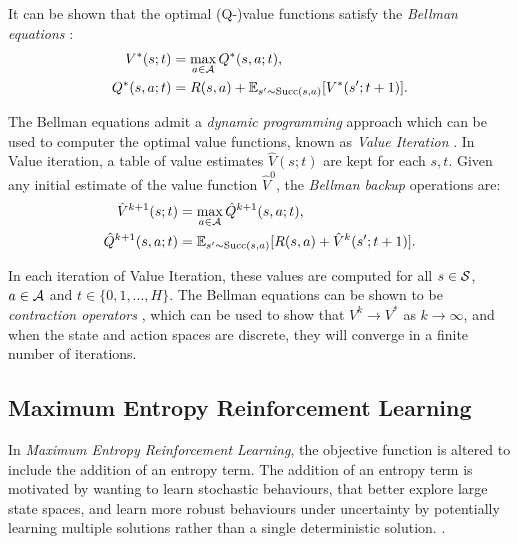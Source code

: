     It can be shown that the optimal (Q-)value functions satisfy the \textit{Bellman equations}  :
    \begin{align}
        V^*(s;t) &= \max_{a\in\mathcal{A}} Q^*(s,a;t), \label{eq:bellman_opt_v} \\
        Q^*(s,a;t) &= R(s,a) + \mathbb{E}_{s'\sim {\textnormal{Succ}(s,a)}} [V^*(s';t+1)]. \label{eq:bellman_opt_q}
    \end{align} 

    The Bellman equations admit a \textit{dynamic programming} approach which can be used to computer the optimal value functions, known as \textit{Value Iteration} . In Value iteration, a table of value estimates $\hat{V}(s;t)$ are kept for each $s,t$. Given any initial estimate of the value function $\hat{V}^{0}$, the \textit{Bellman backup} operations are:
    \begin{align}
        \hat{V}^{k+1}(s;t) &= \max_{a\in\mathcal{A}} \hat{Q}^{k+1}(s,a;t), \label{eq:value_iter_v_backup} \\
        \hat{Q}^{k+1}(s,a;t) &= \mathbb{E}_{s'\sim {\textnormal{Succ}(s,a)}} [R(s,a) + \hat{V}^k(s';t+1)]. \label{eq:value_iter_q_backup}
    \end{align}

    In each iteration of Value Iteration, these values are computed for all $s\in\mathcal{S}$, $a\in\mathcal{A}$ and $t\in\{0,1,...,H\}$. The Bellman equations can be shown to be \textit{contraction operators} , which can be used to show that $V^{k}\rightarrow V^*$ as $k\rightarrow \infty$, and when the state and action spaces are discrete, they will converge in a finite number of iterations. 









    \subsection{Maximum Entropy Reinforcement Learning}
    \label{sec:2-2-1-merl}

        In \textit{Maximum Entropy Reinforcement Learning}, the objective function is altered to include the addition of an entropy term. The addition of an entropy term is motivated by wanting to learn stochastic behaviours, that better explore large state spaces, and learn more robust behaviours under uncertainty by potentially learning multiple solutions rather than a single deterministic solution. \cite{deep_energy_policies}. 
        
